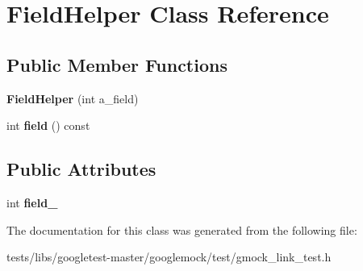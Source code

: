 \hypertarget{classFieldHelper}{}\section{Field\+Helper Class Reference}
\label{classFieldHelper}
\subsection*{Public Member Functions}
\begin{DoxyCompactItemize}
\item 
\mbox{\label{classFieldHelper_a06729cbd5da2993e8007cb62f1d00b3a}} 
{\bfseries Field\+Helper} (int a\+\_\+field)
\item 
\mbox{\label{classFieldHelper_af2959e142813205aeeb4d2ad27430ad3}} 
int {\bfseries field} () const
\end{DoxyCompactItemize}
\subsection*{Public Attributes}
\begin{DoxyCompactItemize}
\item 
\mbox{\label{classFieldHelper_a50a7ec9efc60377363d5ce8bea1708ac}} 
int {\bfseries field\+\_\+}
\end{DoxyCompactItemize}


The documentation for this class was generated from the following file\+:\begin{DoxyCompactItemize}
\item 
tests/libs/googletest-\/master/googlemock/test/gmock\+\_\+link\+\_\+test.\+h\end{DoxyCompactItemize}
